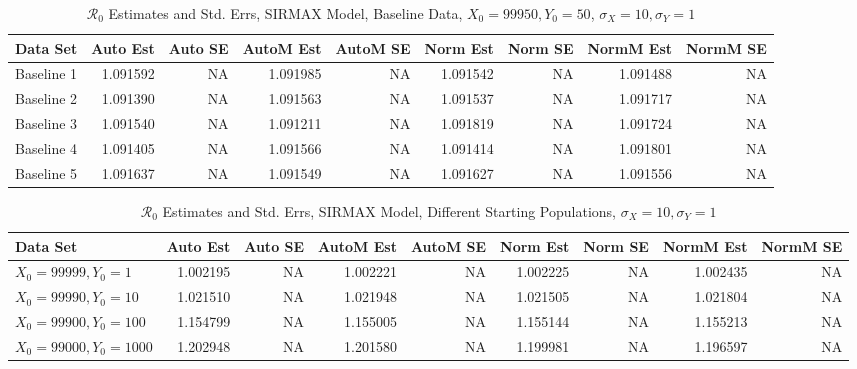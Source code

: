 \documentclass[12pt]{article}
\newcommand{\rr}{\ensuremath{\mathcal{R}_0}}
\begin{document}
\begin{table}[H]
	
	\caption{$\rr$ Estimates and Std. Errs, SIRMAX Model,
		Baseline Data, $X_0 = 99950, Y_0 = 50$, 
		$\sigma_X = 10, \sigma_Y = 1$}
	\begin{footnotesize}
		\hskip -1cm
		\begin{tabular}{l|r|r|r|r|r|r|r|r}
			\hline
			Data Set & Auto Est & Auto SE & AutoM Est & AutoM SE & Norm Est & Norm SE & NormM Est & NormM SE\\
			\hline
			Baseline 1 & 1.091592 & NA & 1.091985 & NA & 1.091542 & NA & 1.091488 & NA\\
			\hline
			Baseline 2 & 1.091390 & NA & 1.091563 & NA & 1.091537 & NA & 1.091717 & NA\\
			\hline
			Baseline 3 & 1.091540 & NA & 1.091211 & NA & 1.091819 & NA & 1.091724 & NA\\
			\hline
			Baseline 4 & 1.091405 & NA & 1.091566 & NA & 1.091414 & NA & 1.091801 & NA\\
			\hline
			Baseline 5 & 1.091637 & NA & 1.091549 & NA & 1.091627 & NA & 1.091556 & NA\\
			\hline
		\end{tabular}
	\end{footnotesize}
\end{table}

\begin{table}[H]
	
	\caption{$\rr$ Estimates and Std. Errs, SIRMAX Model,
		Different Starting Populations, 
		$\sigma_X = 10, \sigma_Y = 1$}
	\begin{footnotesize}
		\hskip -1.7cm
		\begin{tabular}{l|r|r|r|r|r|r|r|r}
			\hline
			Data Set & Auto Est & Auto SE & AutoM Est & AutoM SE & Norm Est & Norm SE & NormM Est & NormM SE\\
			\hline
			$X_0 = 99999, Y_0 = 1$ & 1.002195 & NA & 1.002221 & NA & 1.002225 & NA & 1.002435 & NA\\
			\hline
			$X_0 = 99990, Y_0 = 10$ & 1.021510 & NA & 1.021948 & NA & 1.021505 & NA & 1.021804 & NA\\
			\hline
			$X_0 = 99900, Y_0 = 100$ & 1.154799 & NA & 1.155005 & NA & 1.155144 & NA & 1.155213 & NA\\
			\hline
			$X_0 = 99000, Y_0 = 1000$ & 1.202948 & NA & 1.201580 & NA & 1.199981 & NA & 1.196597 & NA\\
			\hline
		\end{tabular}
	\end{footnotesize}
\end{table}
\end{document}
